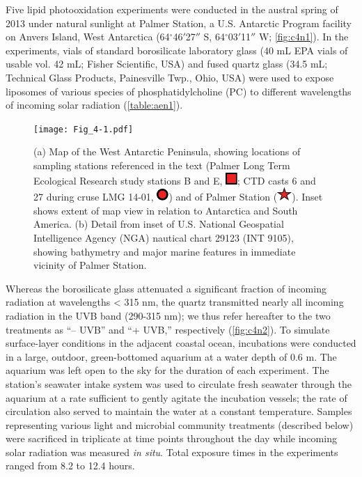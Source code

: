 Five lipid photooxidation experiments were conducted in the austral spring of 2013 under natural sunlight at Palmer Station, a U.S. Antarctic Program facility on Anvers Island, West Antarctica (64$^{\circ}$46$'$27$''$ S, 64$^{\circ}$03$'$11$''$ W; \autoref{fig:c4n1}). In the experiments, vials of standard borosilicate laboratory glass (40 mL EPA vials of usable vol. 42 mL; Fisher Scientific, USA) and fused quartz glass (34.5 mL; Technical Glass Products, Painesville Twp., Ohio, USA) were used to expose liposomes of various species of phosphatidylcholine (PC) to different wavelengths of incoming solar radiation (\autoref{table:aen1}). \begin{figure}
\centering
\texttt{[image: Fig\_4-1.pdf]}
\caption[Map showing locations of sampling stations]{(a) Map of the West Antarctic Peninsula, showing locations of sampling stations referenced in the text (Palmer Long Term Ecological Research study stations B and E, \includegraphics[height=\fontcharht\font`\B]{images/Fig_4-Inline1.pdf}; CTD casts 6 and 27 during cruse LMG 14-01, \includegraphics[height=\fontcharht\font`\B]{images/Fig_4-Inline2.pdf}) and of Palmer Station (\includegraphics[height=\fontcharht\font`\B]{images/Fig_4-Inline3.pdf}). Inset shows extent of map view in relation to Antarctica and South America. (b) Detail from inset of U.S. National Geospatial Intelligence Agency (NGA) nautical chart 29123 (INT 9105), showing bathymetry and major marine features in immediate vicinity of Palmer Station.}
\label{fig:c4n1}
\end{figure}Whereas the borosilicate glass attenuated a significant fraction of incoming radiation at wavelengths \textless{} 315 nm, the quartz transmitted nearly all incoming radiation in the UVB band (290-315 nm); we thus refer hereafter to the two treatments as ``-- UVB'' and ``+ UVB,'' respectively (\autoref{fig:c4n2}). To simulate surface-layer conditions in the adjacent coastal ocean, incubations were conducted in a large, outdoor, green-bottomed aquarium at a water depth of 0.6 m. The aquarium was left open to the sky for the duration of each experiment. The station's seawater intake system was used to circulate fresh seawater through the aquarium at a rate sufficient to gently agitate the incubation vessels; the rate of circulation also served to maintain the water at a constant temperature. Samples representing various light and microbial community treatments (described below) were sacrificed in triplicate at time points throughout the day while incoming solar radiation was measured \emph{in situ}. Total exposure times in the experiments ranged from 8.2 to 12.4 hours.

